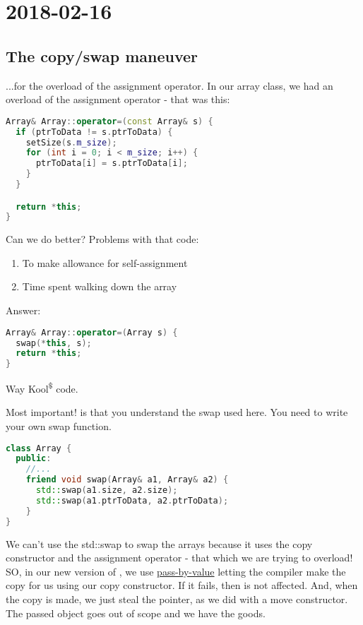 \section{2018-02-16}

\subsection{The copy/swap maneuver}

...for the overload of the assignment operator. In our array class, we had an overload of the assignment operator - that was this:

\begin{lstlisting}[language=C++] 
Array& Array::operator=(const Array& s) {
  if (ptrToData != s.ptrToData) {
    setSize(s.m_size);
    for (int i = 0; i < m_size; i++) {
      ptrToData[i] = s.ptrToData[i];
    }
  }

  return *this;
}
\end{lstlisting}

Can we do better? Problems with that code:

\begin{enumerate}
  \item To make allowance for self-assignment
  \item Time spent walking down the array
\end{enumerate}

Answer:

\begin{lstlisting}[language=C++] 
Array& Array::operator=(Array s) {
  swap(*this, s);
  return *this;
}
\end{lstlisting}

Way Kool\textsuperscript{\$\textregistered\texttrademark} code.

Most important! is that you understand the swap used here. You need to write your own swap function.

\begin{lstlisting}[language=C++] 
class Array {
  public:
    //...
    friend void swap(Array& a1, Array& a2) {
      std::swap(a1.size, a2.size);
      std::swap(a1.ptrToData, a2.ptrToData);
    }
}
\end{lstlisting}

We can't use the std::swap to swap the arrays because it uses the copy constructor and the assignment operator - that which we are trying to overload! SO, in our new version of , we use \underline{pass-by-value} letting the compiler make the copy for us using our copy constructor. If it fails, then  is not affected. And, when the copy is made, we just steal the pointer, as we did with a move constructor. The passed object goes out of scope and we have the goods. 
